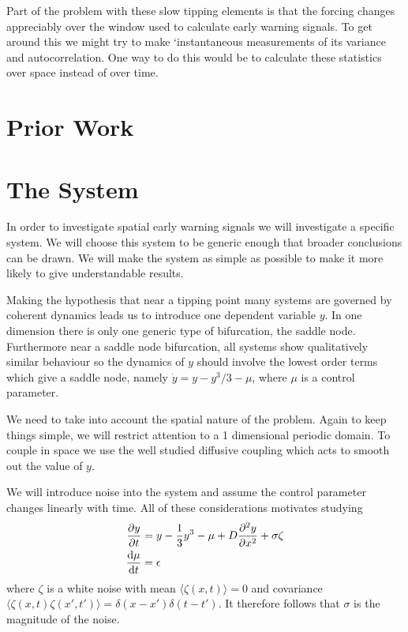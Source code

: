 Part of the problem with these slow tipping elements is that the forcing changes appreciably over the window used to calculate early warning signals.
To get around this we might try to make `instantaneous measurements of its variance and autocorrelation. One way to do this would be to calculate these
statistics over space instead of over time.

\section{Prior Work}

\section{The System}
In order to investigate spatial early warning signals we will investigate a specific system. We will choose this system
to be generic enough that broader conclusions can be drawn. We will make the system as simple as possible to make it more
likely to give understandable results.

Making the hypothesis that near a tipping point many systems are governed by coherent dynamics leads us to introduce one dependent
variable $y$. In one dimension there is only one generic type of bifurcation\cite{Thompson1994}, the saddle node. Furthermore
near a saddle node bifurcation, all systems show qualitatively similar behaviour\cite{guckenheimer2013} so the dynamics of $y$ should
involve the lowest order terms which give a saddle node, namely $\dot{y} = y - y^3/3 - \mu$, where $\mu$ is a control parameter.

We need to take into account the spatial nature of the problem. Again to keep things simple, we will restrict attention to a 1 dimensional
periodic domain. To couple in space we use the well studied diffusive coupling which acts to smooth out the value of $y$.

We will introduce noise into the system and assume the control parameter changes linearly with time. All of these considerations motivates studying
\begin{subequations}
\label{eq:spatial_system}
  \begin{align}
    \pdv{y}{t} &= y - \frac{1}{3}y^3 - \mu + D\pdv[2]{y}{x} + \sigma\zeta \label{eq:spatial_system_y} \\
    \dv{\mu}{t}&= \epsilon \label{eq:spatial_system_mu}
  \end{align}
\end{subequations}
where $\zeta$ is a white noise with mean $\langle \zeta(x,t) \rangle = 0$ and covariance $\langle \zeta(x,t)\zeta(x',t')\rangle = \delta(x-x')\delta(t-t')$.
It therefore follows that $\sigma$ is the magnitude of the noise.

